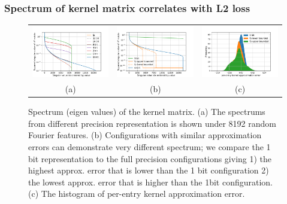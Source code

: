 \subsubsection{Spectrum of kernel matrix correlates with L2 loss}
\label{subsubsec:bump_spectrum}
\begin{figure}
	\centering
	\begin{tabular}{c c c}
		\includegraphics[width=.33\linewidth]{figures/spectrum_n_rff_8192.pdf} &
		\includegraphics[width=.33\linewidth]{figures/different_spectrum_with_same_kernel_approx_error_log.pdf} &
		\includegraphics[width=.33\linewidth]{figures/error_histogram.pdf} \\
		(a) & (b) & (c)
	\end{tabular}
	\caption{Spectrum (eigen values) of the kernel matrix. (a) The spectrums from different precision representation is shown under 8192 random Fourier features. (b) Configurations with similar approximation errors can demonstrate very different spectrum; we compare the 1 bit representation to the full precision configurations giving 1) the highest approx. error that is lower than the 1 bit configuration 2) the lowest approx. error that is higher than the 1bit configuration. (c) The histogram of per-entry kernel approximation error.}
	\label{fig:spectrums}
\end{figure}

